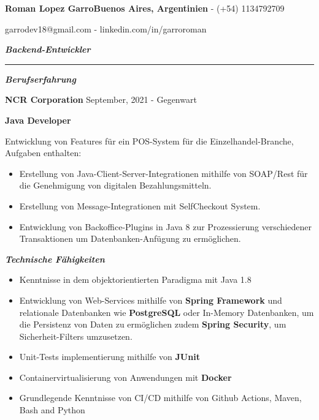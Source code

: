 \documentclass{article}
\begin{document}
\fontsize{18pt}{0pt}
\noindent\textbf{Roman Lopez Garro}\hfill\fontsize{10pt}{0pt}\textbf{Buenos Aires, Argentinien} - (+54) 1134792709

\hfill garrodev18@gmail.com - linkedin.com/in/garroroman

\vspace{1mm}

\fontsize{13pt}{0pt}
\noindent\textit{\textbf{Backend-Entwickler}}
\par\noindent\rule{\textwidth}{0.4pt}

\vspace{4mm}
\fontsize{12pt}{0pt}
\begin{center}
    \textit{\textbf{Berufserfahrung}}
\end{center}

\vspace{1mm}
\setlength{\parindent}{11pt}\fontsize{10pt}{0pt}\textbf{NCR Corporation} \hfill September, 2021 - Gegenwart

\vspace{1mm}
\setlength{\parindent}{11pt}\fontsize{10pt}{0pt}\textbf{Java Developer}

\vspace{4mm}
\indent Entwicklung von Features für ein POS-System für die Einzelhandel-Branche, Aufgaben enthalten:
\begin{itemize}
    \item Erstellung von Java-Client-Server-Integrationen mithilfe von SOAP/Rest für die Genehmigung von digitalen Bezahlungsmitteln.
    \item Erstellung von Message-Integrationen mit SelfCheckout System.
    \item Entwicklung von Backoffice-Plugins in Java 8 zur Prozessierung verschiedener Transaktionen um Datenbanken-Anfügung zu ermöglichen.

\end{itemize}

\vspace{4mm}
\fontsize{12pt}{0pt}
\begin{center}
    \textit{\textbf{Technische Fähigkeiten}}
\end{center}

\fontsize{9pt}{0pt}
\noindent
\begin{itemize}
    \item Kenntnisse in dem objektorientierten Paradigma mit Java 1.8
    \item Entwicklung von Web-Services mithilfe von \textbf{Spring Framework} und relationale Datenbanken wie \textbf{PostgreSQL} oder In-Memory Datenbanken, um die Persistenz von Daten zu ermöglichen zudem \textbf{Spring Security}, um Sicherheit-Filters umzusetzen.
    \item Unit-Tests implementierung mithilfe von \textbf{JUnit}
    \item Containervirtualisierung von Anwendungen mit \textbf{Docker}
    \item Grundlegende Kenntnisse von CI/CD mithilfe von Github Actions, Maven, Bash and Python
\end{itemize}
\end{document}
